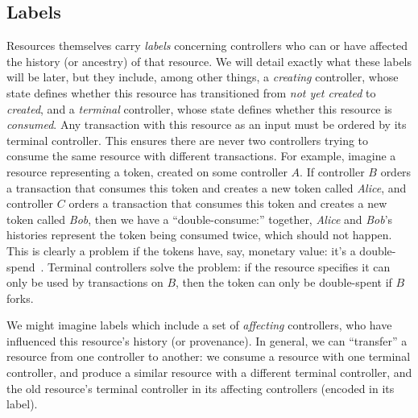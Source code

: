 \documentclass[a4paper,USenglish,cleveref, autoref, thm-restate, anonymous]{lipics-v2021}
\begin{document}
\subsection{Labels}
Resources themselves carry \emph{labels} concerning controllers who can or have affected the history (or ancestry) of that resource.
We will detail exactly what these labels will be later, but they include, among other things,
 a \emph{creating} controller, whose state defines whether this resource has transitioned from \emph{not yet created} to \emph{created}, and a \emph{terminal} controller, whose state defines whether this resource is \emph{consumed}.
Any transaction with this resource as an input must be ordered by its terminal controller.
This ensures there are never two controllers trying to consume the same resource with different transactions.
For example, imagine a resource representing a token, created on some controller $A$.
If controller $B$ orders a transaction that consumes this token and creates a new token called \emph{Alice}, and controller $C$ orders a transaction that consumes this token and creates a new token called \emph{Bob}, then we have a ``double-consume:'' together, \emph{Alice} and \emph{Bob}'s histories represent the token being consumed twice, which should not happen.
This is clearly a problem if the tokens have, say, monetary value: it's a double-spend~\cite{citation-needed}.
Terminal controllers solve the problem: if the resource specifies it can only be used by transactions on $B$, then the token can only be double-spent if $B$ forks.

We might imagine labels which include a set of \textit{affecting} controllers, who have influenced this resource's history (or provenance).
In general, we can ``transfer'' a resource from one controller to another: we consume a resource with one terminal controller, and produce a similar resource with a different terminal controller, and the old resource's terminal controller in its affecting controllers (encoded in its label). 
\end{document}
